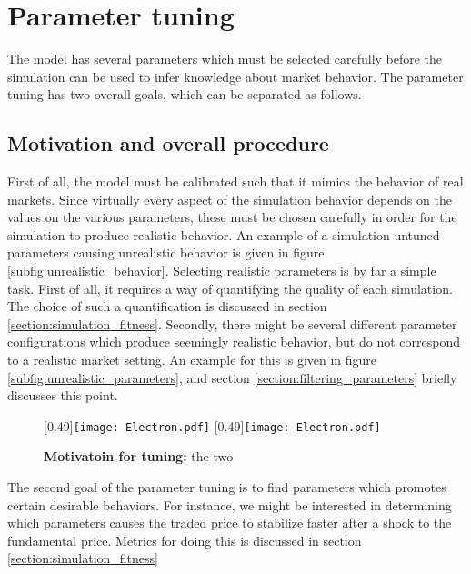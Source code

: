 
\chapter{Parameter tuning} %

	

The model has several parameters which must be selected carefully before the simulation can be used to infer knowledge about market behavior. The parameter tuning has two overall goals, which can be separated as follows. 

\section{Motivation and overall procedure}
First of all, the model must be calibrated such that it mimics the behavior of real markets. Since virtually every aspect of the simulation behavior depends on the values on the various parameters, these must be chosen carefully in order for the simulation to produce realistic behavior. An example of a simulation untuned parameters causing  unrealistic behavior is given in figure \ref{subfig:unrealistic_behavior}. Selecting realistic parameters is by far a simple task. First of all, it requires a way of quantifying the quality of each simulation. The choice of such a quantification is discussed in section \ref{section:simulation_fitness}. Secondly, there might be several different parameter configurations which produce seemingly realistic behavior, but do not correspond to a realistic market setting. An example for this is given in figure \ref{subfig:unrealistic_parameters}, and section \ref{section:filtering_parameters} briefly discusses this point. 

\begin{figure}
	[0.49\linewidth]{\texttt{[image: Electron.pdf]}}
	[0.49\linewidth]{\texttt{[image: Electron.pdf]}}
	\caption{\textbf{Motivatoin for tuning:} the two}\label{fig:tuning_motivation}
\end{figure}

The second goal of the parameter tuning is to find parameters which promotes certain desirable behaviors. For instance, we might be interested in determining which parameters causes the traded price to stabilize faster after a shock to the fundamental price. Metrics for doing this is discussed in section \ref{section:simulation_fitness}

